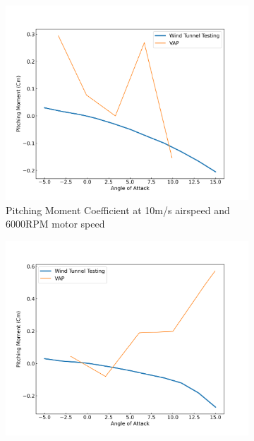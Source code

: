 \begin{figure}[H]
    \centering
    \begin{subfigure}[b]{0.467\textwidth}
        \centering
        \includegraphics[width=\textwidth]{05_Results/VAP/tractor/Cm/10ms_6000RPM_Cm.png}
        \caption{Pitching Moment Coefficient at 10m/s airspeed and 6000RPM motor speed}
        \label{fig:VAP_Cm_10ms_6000}
    \end{subfigure}
    \begin{subfigure}[b]{0.467\textwidth}
        \centering
        \includegraphics[width=\textwidth]{05_Results/VAP/tractor/Cm/10ms_11000RPM_Cm.png}

\end{subfigure}
\end{figure}

